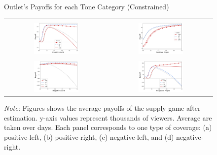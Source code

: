 \documentclass[12pt]{article}
\begin{document}
\begin{figure}[!htb]
	\caption{Outlet's Payoffs for each Tone Category (Constrained)}
	\centering
	\begin{tabular}{@{}cc@{}}
		\text{(a) Positive Left } &
		\text{(b) Positive Right} \\[0.08em]
		\includegraphics[width=0.45\textwidth]{figures/payoff_pos_left_all_positive} &
		\includegraphics[width=0.45\textwidth]{figures/payoff_pos_right_all_positive} \\[1em]
		\text{(c) Negative Left} &
		\text{(d) Negative Right} \\[0.08em]
		\includegraphics[width=0.45\textwidth]{figures/payoff_neg_left_all_positive} &
		\includegraphics[width=0.45\textwidth]{figures/payoff_neg_right_all_positive}
	\end{tabular}
	\caption*{\small \textit{Note:} Figures shows the average payoffs of the supply game after estimation. y-axis values represent thousands of viewers. Average are taken over days. Each panel corresponds to one type of coverage: 
		(a) positive-left, (b) positive-right, (c) negative-left, and (d) negative-right.}
	\label{fig:payoffs_constrained}
\end{figure}
\end{document}
